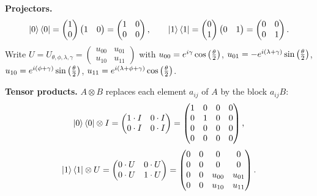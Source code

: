 \documentclass[a4paper, 10pt]{article}
\begin{document}
\begin{solution}
	\noindent \textbf{Projectors.}
	\[
		\ket{0}\bra{0} = \begin{pmatrix} 1 \\ 0 \end{pmatrix}\begin{pmatrix} 1 & 0 \end{pmatrix} = \begin{pmatrix} 1 & 0 \\ 0 & 0 \end{pmatrix}, \qquad
		\ket{1}\bra{1} = \begin{pmatrix} 0 \\ 1 \end{pmatrix}\begin{pmatrix} 0 & 1 \end{pmatrix} = \begin{pmatrix} 0 & 0 \\ 0 & 1 \end{pmatrix}.
	\]
	Write \( U = U_{\theta, \phi, \lambda, \gamma} = \begin{pmatrix} u_{00} & u_{01} \\ u_{10} & u_{11} \end{pmatrix} \) with
	\( u_{00} = e^{i\gamma}\cos\left(\frac{\theta}{2}\right) \), \( u_{01} = -e^{i\left(\lambda + \gamma\right)}\sin\left(\frac{\theta}{2}\right) \), \( u_{10} = e^{i\left(\phi + \gamma\right)}\sin\left(\frac{\theta}{2}\right) \), \( u_{11} = e^{i\left(\lambda + \phi + \gamma\right)}\cos\left(\frac{\theta}{2}\right) \).

	\myspace

	\noindent \textbf{Tensor products.} \( A \otimes B \) replaces each element \( a_{ij} \) of \( A \) by the block \( a_{ij}B \):
	\[
		\ket{0}\bra{0} \otimes I = \begin{pmatrix} 1 \cdot I & 0 \cdot I \\ 0 \cdot I & 0 \cdot I \end{pmatrix} = \begin{pmatrix}
			1 & 0 & 0 & 0 \\
			0 & 1 & 0 & 0 \\
			0 & 0 & 0 & 0 \\
			0 & 0 & 0 & 0
		\end{pmatrix},
	\]
	\[
		\ket{1}\bra{1} \otimes U = \begin{pmatrix} 0 \cdot U & 0 \cdot U \\ 0 \cdot U & 1 \cdot U \end{pmatrix} = \begin{pmatrix}
			0 & 0 & 0      & 0      \\
			0 & 0 & 0      & 0      \\
			0 & 0 & u_{00} & u_{01} \\
			0 & 0 & u_{10} & u_{11}
		\end{pmatrix}.
	\]


\end{solution}
\end{document}
